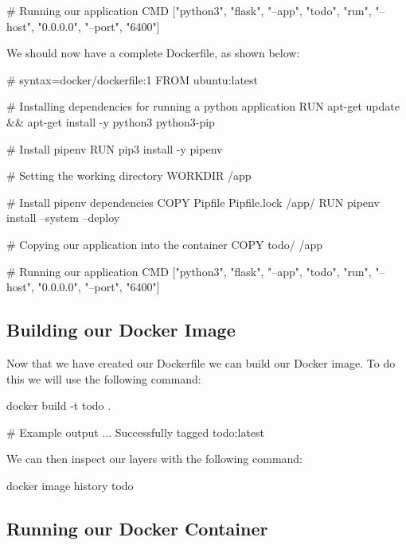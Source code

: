 \documentclass{csse4400}
\begin{document}
\begin{code}[language=docker,numbers=none]{}
  # Running our application
  CMD ["python3", "flask", "--app", "todo", "run", "--host", "0.0.0.0", "--port", "6400"]
\end{code}

We should now have a complete Dockerfile, as shown below:

\begin{code}[language=docker,numbers=none]{}
  # syntax=docker/dockerfile:1
  FROM ubuntu:latest

  # Installing dependencies for running a python application
  RUN apt-get update && apt-get install -y python3 python3-pip

  # Install pipenv
  RUN pip3 install -y pipenv

  # Setting the working directory
  WORKDIR /app

  # Install pipenv dependencies
  COPY Pipfile Pipfile.lock /app/
  RUN pipenv install --system --deploy

  # Copying our application into the container
  COPY todo/ /app
  
  # Running our application
  CMD ["python3", "flask", "--app", "todo", "run", "--host", "0.0.0.0", "--port", "6400"]
\end{code}

\subsection{Building our Docker Image}

Now that we have created our Dockerfile we can build our Docker image. To do this we will use the following command:

\begin{code}[language=bash,numbers=none]{}
  docker build -t todo .

  # Example output
  ...
  Successfully tagged todo:latest
\end{code}

We can then inspect our layers with the following command:

\begin{code}[language=bash,numbers=none]{}
  docker image history todo
\end{code}


\subsection{Running our Docker Container}
\end{document}
